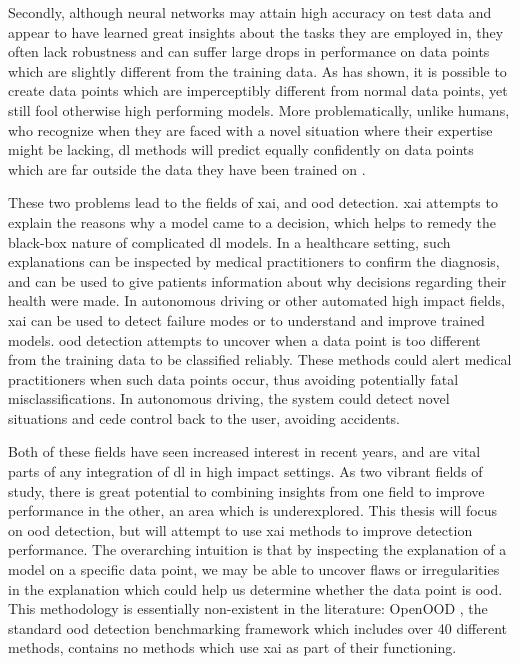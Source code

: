 \documentclass[UKenglish]{uiomasterthesis} %
\theoremstyle{definition}
\begin{document}
Secondly, although neural networks may attain high accuracy on test data and appear to have learned great insights about the tasks they are employed in, they often lack robustness and can suffer large drops in performance on data points which are slightly different from the training data. As \cite{intriguing} has shown, it is possible to create data points which are imperceptibly different from normal data points, yet still fool otherwise high performing models. More problematically, unlike humans, who recognize when they are faced with a novel situation where their expertise might be lacking, \ac{dl} methods will predict equally confidently on data points which are far outside the data they have been trained on \cite{tingsim}.

These two problems lead to the fields of \ac{xai}, and \ac{ood} detection. \ac{xai} attempts to explain the reasons why a model came to a decision, which helps to remedy the black-box nature of complicated \ac{dl} models. In a healthcare setting, such explanations can be inspected by medical practitioners to confirm the diagnosis, and can be used to give patients information about why decisions regarding their health were made. In autonomous driving or other automated high impact fields, \ac{xai} can be used to detect failure modes or to understand and improve trained models. \ac{ood} detection attempts to uncover when a data point is too different from the training data to be classified reliably. These methods could alert medical practitioners when such data points occur, thus avoiding potentially fatal misclassifications. In autonomous driving, the system could detect novel situations and cede control back to the user, avoiding accidents.

Both of these fields have seen increased interest in recent years, and are vital parts of any integration of \ac{dl} in high impact settings. As two vibrant fields of study, there is great potential to combining insights from one field to improve performance in the other, an area which is underexplored. This thesis will focus on \ac{ood} detection, but will attempt to use \ac{xai} methods to improve detection performance. The overarching intuition is that by inspecting the explanation of a model on a specific data point, we may be able to uncover flaws or irregularities in the explanation which could help us determine whether the data point is \ac{ood}. This methodology is essentially non-existent in the literature: OpenOOD \cite{openood, openood15}, the standard \ac{ood} detection benchmarking framework which includes over 40 different methods, contains no methods which use \ac{xai} as part of their functioning.
\end{document}
